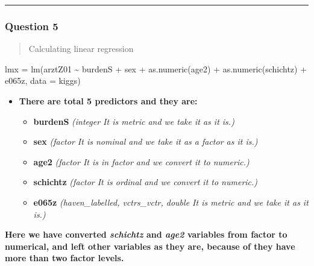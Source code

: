 \documentclass[
]{article}
\newenvironment{Shaded}{\begin{snugshade}}{\end{snugshade}}
\newcommand{\AttributeTok}[1]{\textcolor[rgb]{0.77,0.63,0.00}{#1}}
\newcommand{\FunctionTok}[1]{\textcolor[rgb]{0.00,0.00,0.00}{#1}}
\newcommand{\NormalTok}[1]{#1}
\newcommand{\OtherTok}[1]{\textcolor[rgb]{0.56,0.35,0.01}{#1}}
\newcommand{\SpecialCharTok}[1]{\textcolor[rgb]{0.00,0.00,0.00}{#1}}
\providecommand{\tightlist}{%
  \setlength{\itemsep}{0pt}\setlength{\parskip}{0pt}}
\begin{document}
\begin{center}\rule{0.5\linewidth}{0.5pt}\end{center}

\hypertarget{question-5}{%
\subsubsection{Question 5}\label{question-5}}

\begin{quote}
Calculating linear regression
\end{quote}

\begin{Shaded}
\begin{Highlighting}[]
\NormalTok{lmx }\OtherTok{=} \FunctionTok{lm}\NormalTok{(arztZ01 }\SpecialCharTok{\textasciitilde{}}\NormalTok{ burdenS }\SpecialCharTok{+}\NormalTok{ sex }\SpecialCharTok{+} \FunctionTok{as.numeric}\NormalTok{(age2) }\SpecialCharTok{+} \FunctionTok{as.numeric}\NormalTok{(schichtz) }\SpecialCharTok{+}\NormalTok{ e065z, }\AttributeTok{data =}\NormalTok{ kiggs)}
\end{Highlighting}
\end{Shaded}

\begin{itemize}
\tightlist
\item
  \textbf{There are total 5 predictors and they are:}

  \begin{itemize}
  \tightlist
  \item
    \textbf{burdenS} \emph{(integer \textbar{} It is metric and we take
    it as it is.)}
  \item
    \textbf{sex} \emph{(factor \textbar{} It is nominal and we take it
    as a factor as it is.)}
  \item
    \textbf{age2} \emph{(factor \textbar{} It is in factor and we
    convert it to numeric.)}
  \item
    \textbf{schichtz} \emph{(factor \textbar{} It is ordinal and we
    convert it to numeric.)}
  \item
    \textbf{e065z} \emph{(haven\_labelled, vctrs\_vctr, double
    \textbar{} It is metric and we take it as it is.)}
  \end{itemize}
\end{itemize}

\textbf{Here we have converted \emph{schichtz} and \emph{age2} variables
from factor to numerical, and left other variables as they are, because
of they have more than two factor levels.}
\end{document}
